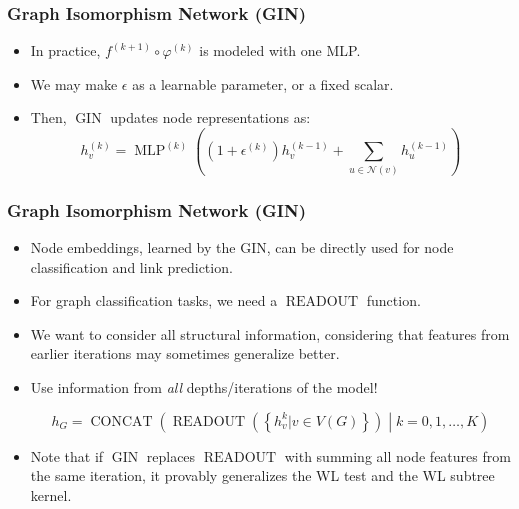 \documentclass[handout]{beamer}
\DeclareMathOperator{\readout}{READOUT}
\DeclareMathOperator{\concat}{CONCAT}
\DeclareMathOperator{\mlp}{MLP}
\DeclareMathOperator{\gin}{GIN}
\begin{document}
\begin{frame}
\frametitle{Graph Isomorphism Network (GIN)}

\begin{itemize}
	\item In practice, $f^{(k + 1)} \circ \varphi^{(k)}$ is modeled with one MLP.\pause
	
	\item We may make $\epsilon$ as a learnable parameter, or a fixed scalar.\pause
	
	\item Then, $\gin$ updates node representations as:
	$$h_v^{(k)} = \mlp^{(k)} \left( \left(1 + \epsilon^{(k)} \right) h_v^{(k - 1)} + \sum_{u \in \mathscr{N}(v)} h_u^{(k - 1)} \right)$$
\end{itemize}

\end{frame}


\begin{frame}
\frametitle{Graph Isomorphism Network (GIN)}

\begin{itemize}
	\item Node embeddings, learned by the GIN, can be directly used for node classification and link prediction. \pause
	
	\item For graph classification tasks, we need a $\readout$ function. \pause
	
	\item We want to consider all structural information, considering that features from earlier iterations may sometimes generalize better. \pause
	
	\item Use information from {\it all} depths/iterations of the model!
	
	$$h_G = \concat \left( \readout \left( \left\{ h_v^{k} | v \in V(G) \right\} \right) \middle| k = 0, 1, \dots, K \right)$$ \pause
	
	\item Note that if $\gin$ replaces $\readout$ with summing all node features from the same iteration, it provably generalizes the WL test and the WL subtree kernel.
\end{itemize}

\end{frame}
\end{document}
